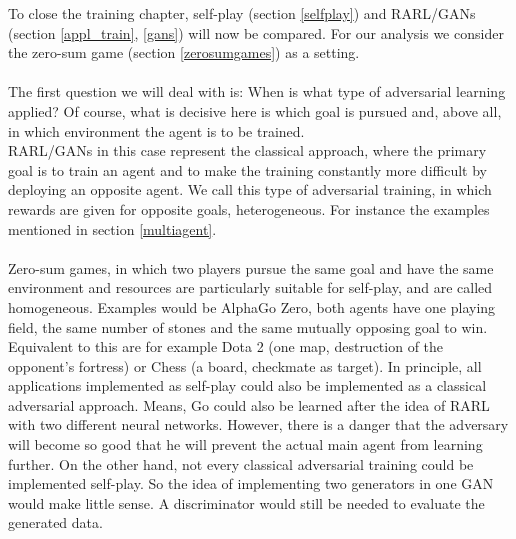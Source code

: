  
 To close the training chapter, self-play (section \ref{selfplay}) and RARL/GANs (section \ref{appl_train}, \ref{gans}) will now be compared.
 For our analysis we consider the zero-sum game (section \ref{zerosumgames}) as a setting. \\
\\
The first question we will deal with is: When is what type of adversarial learning applied?
Of course, what is decisive here is which goal is pursued and, above all, in which environment the agent is to be trained.\\
RARL/GANs in this case represent the classical approach, where the primary goal is to train an agent and to make the training constantly more difficult by deploying an opposite agent. We call this type of adversarial training, in which rewards are given for opposite goals, heterogeneous. For instance the examples mentioned in section \ref{multiagent}.\\
\\
Zero-sum games, in which two players pursue the same goal and have the same environment and resources are particularly suitable for self-play, and are called homogeneous. Examples would be AlphaGo Zero, both agents have one playing field, the same number of stones and the same mutually opposing goal to win. Equivalent to this are for example Dota 2 (one map, destruction of the opponent's fortress) or Chess (a board, checkmate as target).
In principle, all applications implemented as self-play could also be implemented as a classical adversarial approach. Means, Go could also be learned after the idea of RARL with two different neural networks. However, there is a danger that the adversary will become so good that he will prevent the actual main agent from learning further. On the other hand, not every classical adversarial training could be implemented self-play. So the idea of implementing two generators in one GAN would make little sense. A discriminator would still be needed to evaluate the generated data.\\
